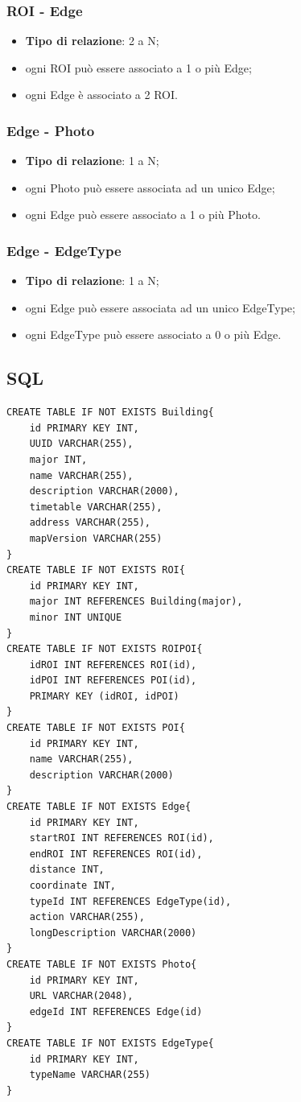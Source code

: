 \documentclass[../SpecificaTecnica.tex]{subfiles}
\begin{document}
		\subsubsection{ROI - Edge}
			\begin{itemize}
				\item \textbf{Tipo di relazione}: 2 a N;
				\item ogni ROI può essere associato a 1 o più Edge;
				\item ogni Edge è associato a 2 ROI.
			\end{itemize}
		\subsubsection{Edge - Photo}
			\begin{itemize}
				\item \textbf{Tipo di relazione}: 1 a N;
				\item ogni Photo può essere associata ad un unico Edge;
				\item ogni Edge può essere associato a 1 o più Photo.
			\end{itemize}
		\subsubsection{Edge - EdgeType}
			\begin{itemize}
				\item \textbf{Tipo di relazione}: 1 a N;
				\item ogni Edge può essere associata ad un unico EdgeType;
				\item ogni EdgeType può essere associato a 0 o più Edge.
			\end{itemize}
	\subsection{SQL}
		\lstset{language=Pascal}
			\begin{lstlisting}
CREATE TABLE IF NOT EXISTS Building{
	id PRIMARY KEY INT,
	UUID VARCHAR(255),
	major INT,
	name VARCHAR(255),
	description VARCHAR(2000),
	timetable VARCHAR(255),
	address VARCHAR(255),
	mapVersion VARCHAR(255)
}
CREATE TABLE IF NOT EXISTS ROI{
	id PRIMARY KEY INT,
	major INT REFERENCES Building(major),
	minor INT UNIQUE
}
CREATE TABLE IF NOT EXISTS ROIPOI{
	idROI INT REFERENCES ROI(id),
	idPOI INT REFERENCES POI(id),
	PRIMARY KEY (idROI, idPOI)
}
CREATE TABLE IF NOT EXISTS POI{
	id PRIMARY KEY INT,
	name VARCHAR(255),
	description VARCHAR(2000)
}
CREATE TABLE IF NOT EXISTS Edge{
	id PRIMARY KEY INT,
	startROI INT REFERENCES ROI(id),
	endROI INT REFERENCES ROI(id),
	distance INT,
	coordinate INT,
	typeId INT REFERENCES EdgeType(id),
	action VARCHAR(255),
	longDescription VARCHAR(2000)
}
CREATE TABLE IF NOT EXISTS Photo{
	id PRIMARY KEY INT,
	URL VARCHAR(2048),
	edgeId INT REFERENCES Edge(id)
}
CREATE TABLE IF NOT EXISTS EdgeType{
	id PRIMARY KEY INT,
	typeName VARCHAR(255)
}
			\end{lstlisting}
\end{document}
